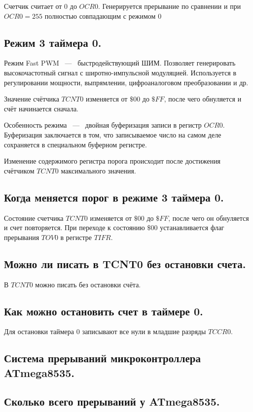 Счетчик считает от $0$ до $OCR0$. Генерируется прерывание по сравнении и при $OCR0 = 255$ 
полностью совпадающим с режимом $0$

\subsection{Режим 3 таймера 0.}
Режим Fast PWM ~---~ быстродействующий ШИМ. Позволяет генерировать
высокочастотный сигнал с широтно-импульсной модуляцией. Используется 
в регулировании мощности, выпрямлении, цифроаналоговом преобразовании и др.

Значение счётчика $TCNT0$ изменяется от $\$00$ до $\$FF$, после чего 
обнуляется и счёт начинается сначала. 


Особенность режима ~---~ двойная буферизация записи в регистр $OCR0$.
Буферизация заключается в том, что записываемое число на самом деле сохраняется в
специальном буферном регистре.

Изменение содержимого регистра порога происходит после достижения 
счётчиком $TCNT0$ максимального значения. 

\subsection{Когда меняется порог в режиме 3 таймера 0.}
Состояние счетчика $TCNT0$ изменяется от $\$00$ до $\$FF$, после чего он обнуляется и счет 
повторяется. При переходе к состоянию $\$00$ устанавливается флаг прерывания $TOV0$ в 
регистре $TIFR$.

\subsection{Можно ли писать в TCNT0 без остановки счета.}
В $TCNT0$ можно писать без остановки счёта.

\subsection{Как можно остановить счет в таймере 0.}
Для остановки таймера $0$ записывают все нули в младшие разряды $TCCR0$.

\subsection{Система прерываний микроконтроллера ATmega8535.}


\subsection{Сколько всего прерываний у ATmega8535.}


